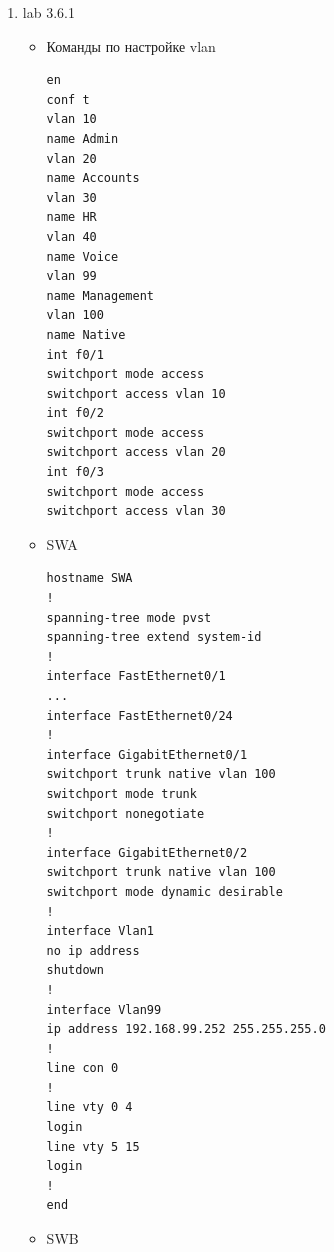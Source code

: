 \documentclass[a4paper,14pt]{extarticle}
\begin{document}
\begin{enumerate}
\begin{itemize}
\begin{center}
                \end{center}
            \item \textbf{Какая сеть VLAN с нетегированным трафиком сейчас используется для этих магистралей?}\par
                Vlan 1
            \item \textbf{Какие сообщения вы получили на S1? Как бы вы исправили эту ошибку?}\par
                Несогласован native vlan. Нужно поменять на S2 и S3 native vlan.
            \item \textbf{Почему пинг не удался?}\par
                На S3 trunk не работает.
            \item \textbf{Какой режим и инкапсуляция на G0/2?}\par
                Вывод команды sh int tr был пуст. 
            \item \textbf{Что отображается состояние "Negotiation of Trunking"?}\par
                 Off
        \end{itemize}
        \item lab 3.6.1
        \begin{itemize}
            \item  Команды по настройке vlan
            \begin{lstlisting}
en
conf t
vlan 10
name Admin
vlan 20
name Accounts
vlan 30
name HR
vlan 40
name Voice
vlan 99
name Management
vlan 100
name Native
int f0/1
switchport mode access
switchport access vlan 10
int f0/2
switchport mode access
switchport access vlan 20
int f0/3
switchport mode access
switchport access vlan 30
            \end{lstlisting}
        \item SWA
            \begin{lstlisting}
hostname SWA
!
spanning-tree mode pvst
spanning-tree extend system-id
!
interface FastEthernet0/1
...
interface FastEthernet0/24
!
interface GigabitEthernet0/1
switchport trunk native vlan 100
switchport mode trunk
switchport nonegotiate
!
interface GigabitEthernet0/2
switchport trunk native vlan 100
switchport mode dynamic desirable
!
interface Vlan1
no ip address
shutdown
!
interface Vlan99
ip address 192.168.99.252 255.255.255.0
!
line con 0
!
line vty 0 4
login
line vty 5 15
login
!
end
            \end{lstlisting}
        \item SWB
            \begin{lstlisting}

\end{lstlisting}
\end{itemize}
\end{enumerate}
\end{document}
